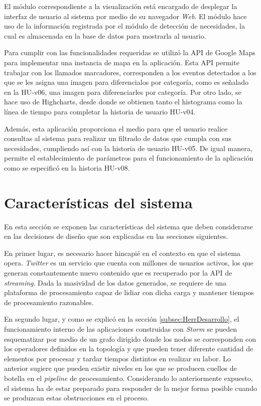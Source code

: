 El módulo correspondiente a la visualización está encargado de desplegar la interfaz de usuario al sistema por medio de su navegador \textit{Web}. El módulo hace uso de la información registrada por el módulo de detección de necesidades, la cual es almacenada en la base de datos para mostrarla al usuario. 

Para cumplir con las funcionalidades requeridas se utilizó la API de Google Maps para implementar una instancia de mapa en la aplicación. Esta API permite trabajar con los llamados marcadores, corresponden a los eventos detectados a los que se les asigna una imagen para diferencialos por categoría, como es señalado en la HU-v06, una imagen para diferenciarles por categoría. Por otro lado, se hace uso de Highcharts, desde donde se obtienen tanto el histograma como la línea de tiempo para completar la historia de usuario HU-v04.

Además, esta aplicación proporciona el medio para que el usuario realice consultas al sistema para realizar un filtrado de datos que cumpla con sus necesidades, cumpliendo así con la historia de usuario HU-v05. De igual manera, permite el establecimiento de parámetros para el funcionamiento de la aplicación como se especificó en la historia HU-v08.

\section{Características del sistema}
\label{sec:caracteristicasSistema}

En esta sección se exponen las características del sistema que deben considerarse en las decisiones de diseño que son explicadas en las secciones siguientes.

En primer lugar, es necesario hacer hincapié en el contexto en que el sistema opera. \textit{Twitter} es un servicio que cuenta con millones de usuarios activos, los que generan constantemente nuevo contenido que es recuperado por la API de \textit{streaming}. Dada la masividad de los datos generados, se requiere de una plataforma de procesamiento capaz de lidiar con dicha carga y mantener tiempos de procesamiento razonables.

En segundo lugar, y como se explicó en la sección \ref{subsec:HerrDesarrollo}, el funcionamiento interno de las aplicaciones construidas con \textit{Storm} se pueden esquematizar por medio de un grafo dirigido donde los nodos se corresponden con los operadores definidos en la topología y que pueden tener diferente cantidad de elementos por procesar y tardar tiempos distintos en realizar su labor. Lo anterior sugiere que pueden existir niveles en los que se producen cuellos de botella en el \textit{pipeline} de procesamiento. Considerando lo anteriormente expuesto, el sistema ha de estar preparado para responder de la mejor forma posible cuando se produzcan estas obstrucciones en el proceso.

